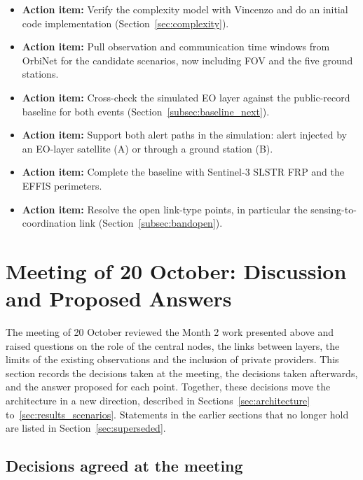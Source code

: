 \documentclass[11pt]{article}
\newcommand{\actionitem}[1]{\textcolor{todo}{\textbf{Action item:}} #1}
\begin{document}
\begin{itemize}[leftmargin=1.2cm]
    \item \actionitem{Verify the complexity model with Vincenzo and do an initial code implementation (Section~\ref{sec:complexity}).}
    \item \actionitem{Pull observation and communication time windows from OrbiNet for the candidate scenarios, now including FOV and the five ground stations.}
    \item \actionitem{Cross-check the simulated EO layer against the public-record baseline for both events (Section~\ref{subsec:baseline_next}).}
    \item \actionitem{Support both alert paths in the simulation: alert injected by an EO-layer satellite (A) or through a ground station (B).}
    \item \actionitem{Complete the baseline with Sentinel-3 SLSTR FRP and the EFFIS perimeters.}
    \item \actionitem{Resolve the open link-type points, in particular the sensing-to-coordination link (Section~\ref{subsec:bandopen}).}
\end{itemize}

\section{Meeting of 20 October: Discussion and Proposed Answers}\label{sec:meeting20oct}

The meeting of 20 October reviewed the Month 2 work presented above and raised questions on the role of the central nodes, the links between layers, the limits of the existing observations and the inclusion of private providers. This section records the decisions taken at the meeting, the decisions taken afterwards, and the answer proposed for each point. Together, these decisions move the architecture in a new direction, described in Sections~\ref{sec:architecture} to~\ref{sec:results_scenarios}. Statements in the earlier sections that no longer hold are listed in Section~\ref{sec:superseded}.

\subsection{Decisions agreed at the meeting}\label{subsec:decisions20oct}
\end{document}
